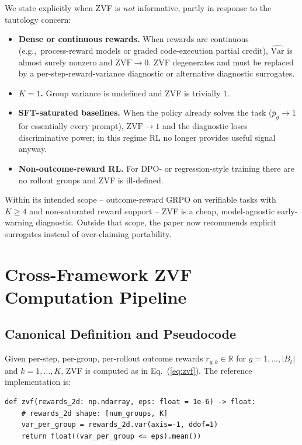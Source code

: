 \documentclass{article}
\begin{document}
We state explicitly when ZVF is \emph{not} informative, partly in response
to the tautology concern:
\begin{itemize}[leftmargin=1.2em,itemsep=0pt]
  \item \textbf{Dense or continuous rewards.} When rewards are continuous
        (e.g.,~process-reward models or graded code-execution partial credit),
        $\widehat{\mathrm{Var}}$ is almost surely nonzero and
        $\mathrm{ZVF} \to 0$. ZVF degenerates and must be replaced by a
        per-step-reward-variance diagnostic or alternative diagnostic surrogates.
  \item \textbf{$K=1$.} Group variance is undefined and ZVF is trivially $1$.
  \item \textbf{SFT-saturated baselines.} When the policy already solves
        the task ($\bar p_g \to 1$ for essentially every prompt),
        $\mathrm{ZVF} \to 1$ and the diagnostic loses discriminative power;
        in this regime RL no longer provides useful signal anyway.
  \item \textbf{Non-outcome-reward RL.} For DPO- or regression-style
        training there are no rollout groups and ZVF is ill-defined.
\end{itemize}
Within its intended scope -- outcome-reward GRPO on verifiable tasks with
$K \ge 4$ and non-saturated reward support -- ZVF is a cheap, model-agnostic
early-warning diagnostic. Outside that scope, the paper now recommends
explicit surrogates instead of over-claiming portability.
 
\begingroup
\newcommand{\artifactstatusword}{anonymous}
\providecommand{\artifactstatusword}{released}
\section{Cross-Framework ZVF Computation Pipeline}
\label{sec:appendix:zvf-pipeline}

\subsection{Canonical Definition and Pseudocode}

Given per-step, per-group, per-rollout outcome rewards
$r_{g,k} \in \mathbb{R}$ for $g=1,\ldots,|B_t|$ and $k=1,\ldots,K$, ZVF
is computed as in Eq.~(\ref{eq:zvf}). The reference implementation is:
\begin{verbatim}
def zvf(rewards_2d: np.ndarray, eps: float = 1e-6) -> float:
    # rewards_2d shape: [num_groups, K]
    var_per_group = rewards_2d.var(axis=-1, ddof=1)
    return float((var_per_group <= eps).mean())
\end{verbatim}
\end{document}
